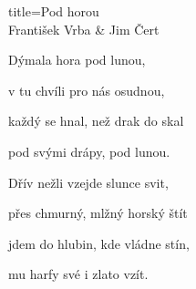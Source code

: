 \begin{song}{title=\predtitle\centering Pod horou \\\large  František Vrba \& Jim Čert  \vspace*{-0.3cm}}
{\begin{centerjustified}
\begin{varwidth}[t]{0.41\textwidth}
\sloka
Dýmala hora pod lunou,

v tu chvíli pro nás osudnou,

každý se hnal, než drak do skal

pod svými drápy, pod lunou.

\sloka
Dřív nežli vzejde slunce svit,

přes chmurný, mlžný horský štít

jdem do hlubin, kde vládne stín,

mu harfy své i zlato vzít.

\end{varwidth}

\end{centerjustified}
}

\setcounter{Slokočet}{0}
\end{song}
